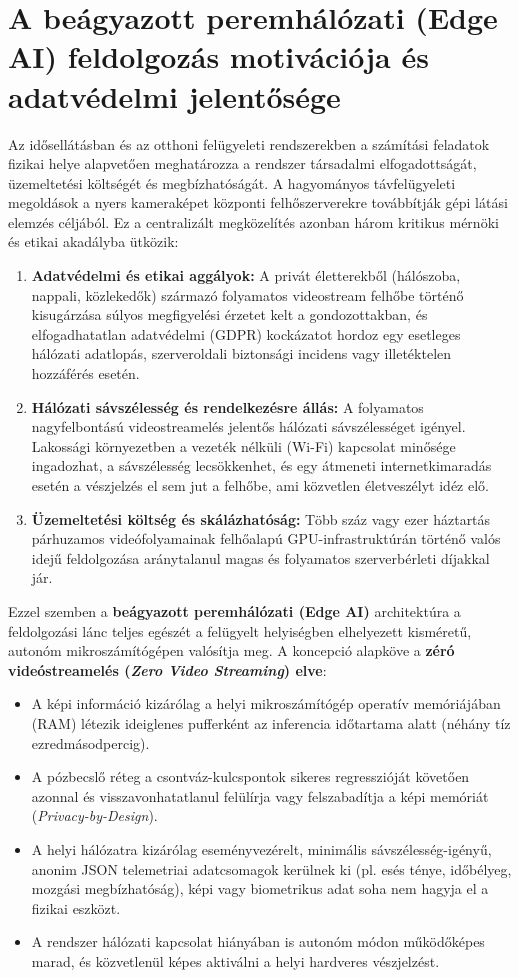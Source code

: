 \documentclass[12pt,a4paper,oneside]{report}
\begin{document}
\section{A beágyazott peremhálózati (Edge AI) feldolgozás motivációja és adatvédelmi jelentősége}
Az idősellátásban és az otthoni felügyeleti rendszerekben a számítási feladatok fizikai helye alapvetően meghatározza a rendszer társadalmi elfogadottságát, üzemeltetési költségét és megbízhatóságát. A hagyományos távfelügyeleti megoldások a nyers kameraképet központi felhőszerverekre továbbítják gépi látási elemzés céljából. Ez a centralizált megközelítés azonban három kritikus mérnöki és etikai akadályba ütközik:
\begin{enumerate}
    \item \textbf{Adatvédelmi és etikai aggályok:} A privát életterekből (hálószoba, nappali, közlekedők) származó folyamatos videostream felhőbe történő kisugárzása súlyos megfigyelési érzetet kelt a gondozottakban, és elfogadhatatlan adatvédelmi (GDPR) kockázatot hordoz egy esetleges hálózati adatlopás, szerveroldali biztonsági incidens vagy illetéktelen hozzáférés esetén.
    \item \textbf{Hálózati sávszélesség és rendelkezésre állás:} A folyamatos nagyfelbontású videostreamelés jelentős hálózati sávszélességet igényel. Lakossági környezetben a vezeték nélküli (Wi-Fi) kapcsolat minősége ingadozhat, a sávszélesség lecsökkenhet, és egy átmeneti internetkimaradás esetén a vészjelzés el sem jut a felhőbe, ami közvetlen életveszélyt idéz elő.
    \item \textbf{Üzemeltetési költség és skálázhatóság:} Több száz vagy ezer háztartás párhuzamos videófolyamainak felhőalapú GPU-infrastruktúrán történő valós idejű feldolgozása aránytalanul magas és folyamatos szerverbérleti díjakkal jár.
\end{enumerate}

Ezzel szemben a \textbf{beágyazott peremhálózati (Edge AI)} architektúra a feldolgozási lánc teljes egészét a felügyelt helyiségben elhelyezett kisméretű, autonóm mikroszámítógépen valósítja meg. A koncepció alapköve a \textbf{zéró videóstreamelés (\textit{Zero Video Streaming}) elve}:
\begin{itemize}
    \item A képi információ kizárólag a helyi mikroszámítógép operatív memóriájában (RAM) létezik ideiglenes pufferként az inferencia időtartama alatt (néhány tíz ezredmásodpercig).
    \item A pózbecslő réteg a csontváz-kulcspontok sikeres regresszióját követően azonnal és visszavonhatatlanul felülírja vagy felszabadítja a képi memóriát (\textit{Privacy-by-Design}).
    \item A helyi hálózatra kizárólag eseményvezérelt, minimális sávszélesség-igényű, anonim JSON telemetriai adatcsomagok kerülnek ki (pl. esés ténye, időbélyeg, mozgási megbízhatóság), képi vagy biometrikus adat soha nem hagyja el a fizikai eszközt.
    \item A rendszer hálózati kapcsolat hiányában is autonóm módon működőképes marad, és közvetlenül képes aktiválni a helyi hardveres vészjelzést.
\end{itemize}
\end{document}
